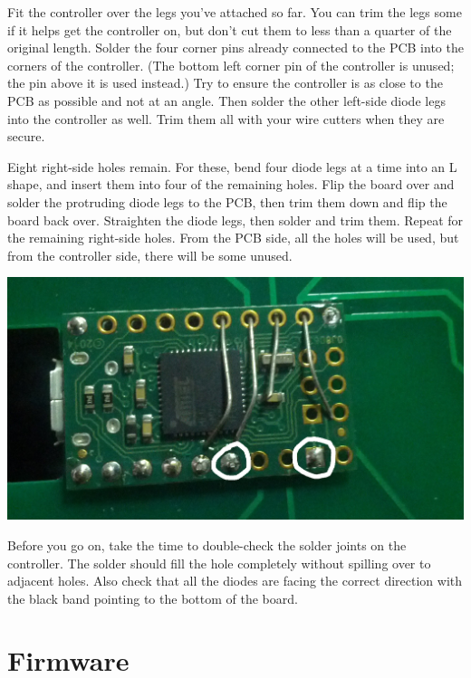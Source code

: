 \documentclass[landscape,twocolumn]{article}
\begin{document}
Fit the controller over the legs you've attached so far. You can trim
the legs some if it helps get the controller on, but don't cut them to
less than a quarter of the original length. Solder the four corner
pins already connected to the PCB into the corners of the
controller. (The bottom left corner pin of the controller is unused;
the pin above it is used instead.) Try to ensure the controller is as
close to the PCB as possible and not at an angle. Then solder the
other left-side diode legs into the controller as well. Trim them all
with your wire cutters when they are secure.

\vspace{1em}

Eight right-side holes remain. For these, bend four diode legs at a
time into an L shape, and insert them into four of the remaining
holes. Flip the board over and solder the protruding diode legs to the
PCB, then trim them down and flip the board back over. Straighten the
diode legs, then solder and trim them. Repeat for the remaining
right-side holes. From the PCB side, all the holes will be used, but
from the controller side, there will be some unused.

\vspace{1em}
\begin{center}
  \includegraphics[width=0.8\columnwidth]{bent-legs.jpg}
\end{center}
\vspace{1em}

Before you go on, take the time to double-check the solder joints on
the controller. The solder should fill the hole completely without
spilling over to adjacent holes. Also check that all the diodes are
facing the correct direction with the black band pointing to the
bottom of the board.

\section{Firmware}
\end{document}
